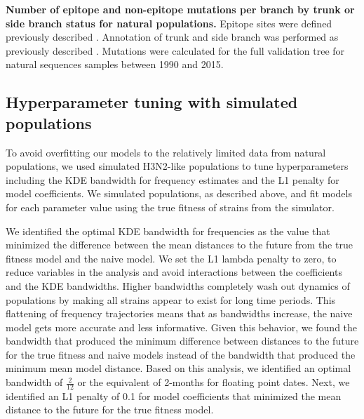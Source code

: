 \begin{table}
  \begin{center}
    
    \caption[{Number of epitope and non-epitope mutations per branch by trunk or side branch status for natural populations.}]{
    {\bf Number of epitope and non-epitope mutations per branch by trunk or side branch status for natural populations.}
    Epitope sites were defined previously described \citep{Luksza:2014hj}.
    Annotation of trunk and side branch was performed as previously described \citep{Bedford:2015fj}.
    Mutations were calculated for the full validation tree for natural sequences samples between 1990 and 2015.
    }
    \label{table:mutations_by_trunk_status}
  \end{center}
\end{table}

\subsection{Hyperparameter tuning with simulated populations}

To avoid overfitting our models to the relatively limited data from natural populations, we used simulated H3N2-like populations to tune hyperparameters including the KDE bandwidth for frequency estimates and the L1 penalty for model coefficients.
We simulated populations, as described above, and fit models for each parameter value using the true fitness of strains from the simulator.

We identified the optimal KDE bandwidth for frequencies as the value that minimized the difference between the mean distances to the future from the true fitness model and the naive model.
We set the L1 lambda penalty to zero, to reduce variables in the analysis and avoid interactions between the coefficients and the KDE bandwidths.
Higher bandwidths completely wash out dynamics of populations by making all strains appear to exist for long time periods.
This flattening of frequency trajectories means that as bandwidths increase, the naive model gets more accurate and less informative.
Given this behavior, we found the bandwidth that produced the minimum difference between distances to the future for the true fitness and naive models instead of the bandwidth that produced the minimum mean model distance.
Based on this analysis, we identified an optimal bandwidth of $\frac{2}{12}$ or the equivalent of 2-months for floating point dates.
Next, we identified an L1 penalty of 0.1 for model coefficients that minimized the mean distance to the future for the true fitness model.

